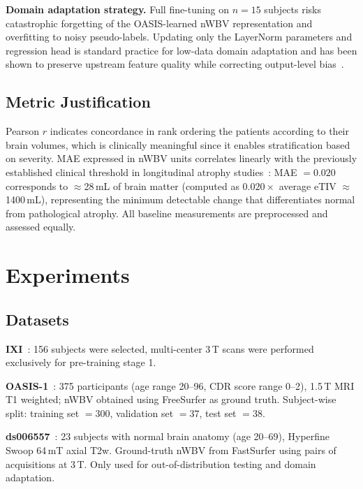 \documentclass{ieeeaccess}
\begin{document}
\textbf{Domain adaptation strategy.}
Full fine-tuning on $n=15$ subjects risks catastrophic forgetting of the
OASIS-learned nWBV representation and overfitting to noisy pseudo-labels.
Updating only the LayerNorm parameters and regression head is standard
practice for low-data domain adaptation and has been shown to preserve
upstream feature quality while correcting output-level bias~\cite{karani2018lifelong}.

\subsection{Metric Justification}
\label{sec:metrics}

Pearson $r$ indicates concordance in rank ordering the patients according to
their brain volumes, which is clinically meaningful since it enables
stratification based on severity. MAE expressed in nWBV units correlates
linearly with the previously established clinical threshold in longitudinal
atrophy studies~\cite{buckner2004}: MAE $= 0.020$ corresponds to
$\approx$28\,mL of brain matter (computed as $0.020 \times$ average eTIV
$\approx$1400\,mL), representing the minimum detectable change that
differentiates normal from pathological atrophy. All
baseline measurements are preprocessed and assessed equally.

\section{Experiments}
\label{sec:experiments}

\subsection{Datasets}

\textbf{IXI}~\cite{ixi2017}: 156 subjects were selected, multi-center 3\,T
scans were performed exclusively for pre-training stage 1.

\textbf{OASIS-1}~\cite{marcus2007oasis}: 375 participants (age range 20--96,
CDR score range 0--2), 1.5\,T MRI T1 weighted; nWBV obtained using
FreeSurfer as ground truth. Subject-wise split: training set $= 300$,
validation set $= 37$, test set $= 38$.

\textbf{ds006557}~\cite{vasa2025}: 23 subjects with normal brain anatomy (age
20--69), Hyperfine Swoop 64\,mT axial T2w. Ground-truth nWBV from FastSurfer
using pairs of acquisitions at 3\,T. Only used for out-of-distribution
testing and domain adaptation.
\end{document}
